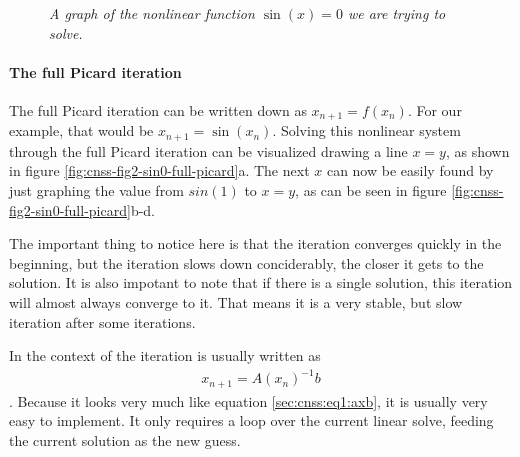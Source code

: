 \begin{figure}
    \label{fig:cnss-fig1-sin0}
\caption{\it A graph of the nonlinear function {$\sin(x)=0$} we are trying to solve.}
\end{figure}

\paragraph{The full Picard iteration}

The full Picard iteration can be written down as $x_{n+1} = f(x_{n})$. For our example, 
that would be $x_{n+1} = \sin(x_{n})$. Solving this nonlinear system through the full Picard 
iteration can be visualized drawing a line $x = y$, as shown in figure 
\ref{fig:cnss-fig2-sin0-full-picard}a. The next $x$ can now be easily found by just graphing 
the value from $sin(1)$ to $x = y$, as can be seen in figure \ref{fig:cnss-fig2-sin0-full-picard}b-d.

The important thing to notice here is that the iteration converges quickly in the beginning, 
but the iteration slows down conciderably, the closer it gets to the solution. It is also 
impotant to note that if there is a single solution, this iteration will almost always 
converge to it. That means it is a very stable, but slow iteration after some iterations. 

In the context of \aspect{} the iteration is usually written as 
\begin{align}
    x_{n+1} = A(x_n)^{-1}b
\end{align}. Because it looks very much like equation \ref{sec:cnss:eq1:axb}, it is usually 
very easy to implement. It only requires a loop over the current linear solve, feeding 
the current solution as the new guess.

